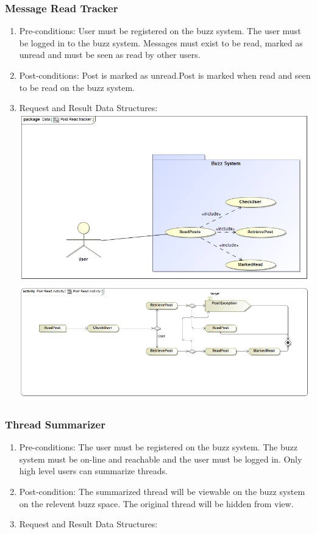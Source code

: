 \documentclass[hidelinks, 12pt, oneside]{article}
\begin{document}
\subsubsection{Message Read Tracker}
\begin{enumerate}
 \item Pre-conditions:  User must be registered on the buzz system. The user must be logged in to the buzz system. Messages must exist to be read, marked as unread and must be seen as read by other users.
 \\
 \item Post-conditions: Post is marked as unread.Post is marked when read and seen to be read on the buzz system.
   \\
 \item Request and Result Data Structures:\\
   \includegraphics[scale=0.4]{PostReadTracker}\\
 \includegraphics[scale=0.4]{PostReadActivity} 
\end{enumerate}
\subsubsection{Thread Summarizer}
\begin{enumerate}
 \item Pre-conditions:  The user must be registered on the buzz system. The buzz system must be on-line and reachable and the user must be logged in. Only high level users can summarize threads.
 \item Post-condition:  The summarized thread will be viewable on the buzz system on the relevent buzz space. The original thread will be hidden from view.
 \\
\item Request and Result Data Structures:\\
\end{enumerate}
\end{document}
